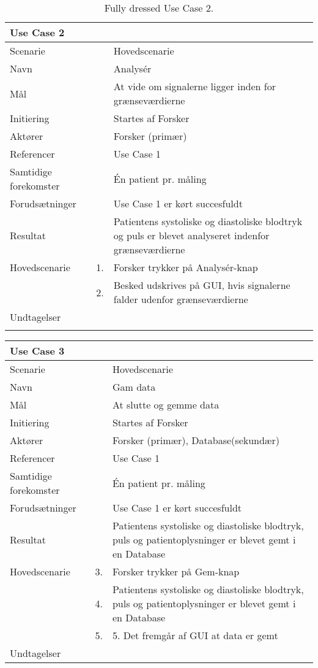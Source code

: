 \begin{longtabu} to  %
    {\large \textbf{Use Case 2}} && \\
    \toprule
    Scenarie && Hovedscenarie\\
    Navn && Analysér\\
    Mål && At vide om signalerne ligger inden for grænseværdierne\\
    Initiering && Startes af Forsker\\
    Aktører && Forsker (primær)\\
    Referencer && Use Case 1\\
    Samtidige forekomster  && Én patient pr. måling\\
    Forudsætninger && Use Case 1 er kørt succesfuldt\\
    Resultat && Patientens systoliske og diastoliske blodtryk og puls er blevet analyseret indenfor grænseværdierne\\ \midrule
    Hovedscenarie &    1. &		Forsker trykker på Analysér-knap\\[-1ex] 
                  &    2. &     Besked udskrives på GUI, hvis signalerne falder udenfor grænseværdierne\\ \midrule	 	
 Undtagelser &    & \\ \bottomrule
\caption{Fully dressed Use Case 2.}
\label{UC2}
\end{longtabu}

\begin{longtabu} to  %
    {\large \textbf{Use Case 3}} && \\
    \toprule
    Scenarie && Hovedscenarie\\
    Navn && Gam data\\
    Mål && At slutte og gemme data\\
    Initiering && Startes af Forsker\\
    Aktører && Forsker (primær), Database(sekundær)\\
    Referencer && Use Case 1\\
    Samtidige forekomster  && Én patient pr. måling\\
    Forudsætninger && Use Case 1 er kørt succesfuldt\\
    Resultat && Patientens systoliske og diastoliske blodtryk, puls og patientoplysninger er blevet gemt i en Database\\ \midrule
    Hovedscenarie &    3. &		Forsker trykker på Gem-knap\\[-1ex] 
                  &    4. &     Patientens systoliske og diastoliske blodtryk, puls og patientoplysninger er blevet gemt i en Database\\
                    &    5. &     5.	Det fremgår af GUI at data er gemt\\ \midrule	 	
 Undtagelser &    & \\ \bottomrule

\end{longtabu}



